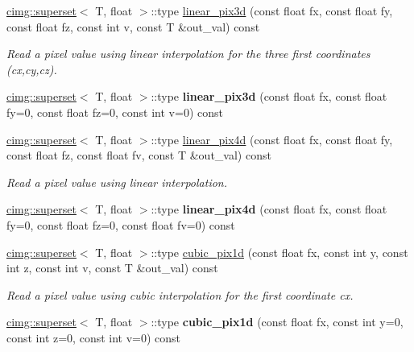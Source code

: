 \begin{DoxyCompactItemize}
\item 
\hyperlink{structcimg__library_1_1cimg_1_1superset}{cimg\-::superset}$<$ T, float $>$\-::type \hyperlink{structcimg__library_1_1_c_img_a99af7b06c856fffc82a8872f2ebd5e8c}{linear\-\_\-pix3d} (const float fx, const float fy, const float fz, const int v, const T \&out\-\_\-val) const 
\begin{DoxyCompactList}\small\item\em Read a pixel value using linear interpolation for the three first coordinates ({\ttfamily cx},{\ttfamily cy},{\ttfamily cz}). \end{DoxyCompactList}\item 
\hypertarget{structcimg__library_1_1_c_img_aa05944893686027ccff1bce23d30e65a}{\hyperlink{structcimg__library_1_1cimg_1_1superset}{cimg\-::superset}$<$ T, float $>$\-::type {\bfseries linear\-\_\-pix3d} (const float fx, const float fy=0, const float fz=0, const int v=0) const }\label{structcimg__library_1_1_c_img_aa05944893686027ccff1bce23d30e65a}

\item 
\hyperlink{structcimg__library_1_1cimg_1_1superset}{cimg\-::superset}$<$ T, float $>$\-::type \hyperlink{structcimg__library_1_1_c_img_ad201bbecc0caabbe566ea7507cd657cf}{linear\-\_\-pix4d} (const float fx, const float fy, const float fz, const float fv, const T \&out\-\_\-val) const 
\begin{DoxyCompactList}\small\item\em Read a pixel value using linear interpolation. \end{DoxyCompactList}\item 
\hypertarget{structcimg__library_1_1_c_img_ab1ed87171690e98fba5959ee4340c6fa}{\hyperlink{structcimg__library_1_1cimg_1_1superset}{cimg\-::superset}$<$ T, float $>$\-::type {\bfseries linear\-\_\-pix4d} (const float fx, const float fy=0, const float fz=0, const float fv=0) const }\label{structcimg__library_1_1_c_img_ab1ed87171690e98fba5959ee4340c6fa}

\item 
\hyperlink{structcimg__library_1_1cimg_1_1superset}{cimg\-::superset}$<$ T, float $>$\-::type \hyperlink{structcimg__library_1_1_c_img_ad344a30f3cdc6d089ef2267a86d4847f}{cubic\-\_\-pix1d} (const float fx, const int y, const int z, const int v, const T \&out\-\_\-val) const 
\begin{DoxyCompactList}\small\item\em Read a pixel value using cubic interpolation for the first coordinate {\ttfamily cx}. \end{DoxyCompactList}\item 
\hypertarget{structcimg__library_1_1_c_img_a751f88326a0b29a28a0a111ce5bb68f4}{\hyperlink{structcimg__library_1_1cimg_1_1superset}{cimg\-::superset}$<$ T, float $>$\-::type {\bfseries cubic\-\_\-pix1d} (const float fx, const int y=0, const int z=0, const int v=0) const }\label{structcimg__library_1_1_c_img_a751f88326a0b29a28a0a111ce5bb68f4}


\end{DoxyCompactItemize}

